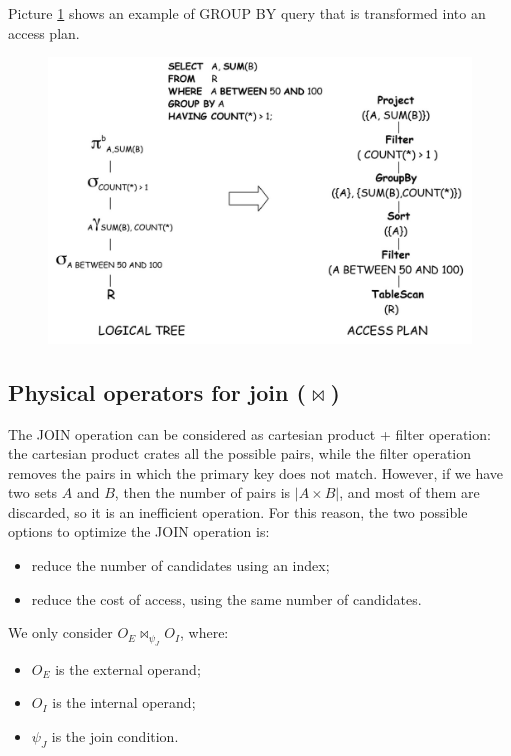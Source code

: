 Picture \ref{relop6} shows an example of GROUP BY query that is transformed into an access plan.


\begin{figure}[h!]
		\centering
		\includegraphics[scale = 0.8]{img/relop6.jpg}
		\label{relop6}
\end{figure}

\subsection{Physical operators for join ($\bowtie$)}
The JOIN operation can be considered as cartesian product + filter operation: the cartesian product crates all the possible pairs, while the filter operation removes the pairs in which the primary key does not match. However, if we have two sets $A$ and $B$, then the number of pairs is  $|A \times B|$, and most of them are discarded, so it is an inefficient operation. For this reason, the two possible options to optimize the JOIN operation is:

\begin{itemize}
    \item reduce the number of candidates using an index;
    \item reduce the cost of access, using the same number of candidates.
\end{itemize}

We only consider $O_E \bowtie_{\psi_J} O_I$, where:
\begin{itemize}
    \item $O_E$ is the external operand;
    \item $O_I$ is the internal operand;
    \item $\psi_J$ is the join condition.
\end{itemize}

